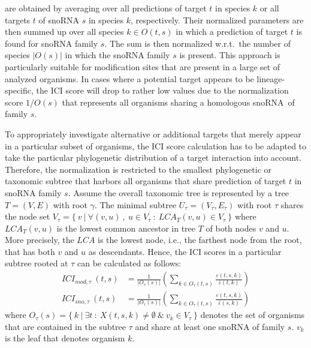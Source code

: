 \documentclass[preprint,3p,times]{elsarticle}
\newcommand{\sno}{snoRNA}
\begin{document}
are obtained by averaging over all predictions of target $t$ in
species $k$ or all targets $t$ of snoRNA $s$ in species $k$,
respectively.  Their normalized parameters are then summed up over all
species $k\in O(t,s)$ in which a prediction of target $t$ is found for
snoRNA family $s$. The sum is then normalized w.r.t.\ the number of
species $|O(s)|$ in which the snoRNA family $s$ is present. This
approach is particularly suitable for modification sites that are
present in a large set of analyzed organisms. In cases where a
potential target appears to be lineage-specific, the ICI score will
drop to rather low values due to the normalization score $1/O(s)$ that
represents all organisms sharing a homologous \sno\ of family $s$.

To appropriately investigate alternative or additional targets that
merely appear in a particular subset of organisms, the ICI score
calculation has to be adapted to take the particular phylogenetic
distribution of a target interaction into account. Therefore, the
normalization is restricted to the smallest phylogenetic or taxonomic
subtree that harbors all organisms that share prediction of target
$t$ in snoRNA family $s$.  Assume the overall taxonomic tree is
represented by a tree $T=(V,E)$ with root $\gamma$. The minimal
subtree $U_\tau = (V_\tau, E_\tau)$ with root $\tau$ shares the node
set
$V_\tau = \{\ v\ |\ \forall (v,u)\ ,\ u \in V_\tau\ :\ LCA_T(v,u) \in
V_\tau\ \}$ where $LCA_T(v,u)$ is the lowest common ancestor in tree
$T$ of both nodes $v$ and $u$. More precisely, the $LCA$ is the lowest
node, i.e., the farthest node from the root, that has both $v$ and $u$
as descendants.  Hence, the ICI scores in a particular subtree rooted
at $\tau$ can be calculated as follows:
\begin{equation}
  \begin{split}
    ICI_{mod,\tau}\:(t,s) & = \frac{1}{|O_\tau(s)|}  \left( \sum_{k\in O_\tau(t,s)} \frac{\varepsilon(t,s,k)}{\bar\varepsilon(t,k)} \right)
    \\
    ICI_{sno,\tau}\:(t,s) & = \frac{1}{|O_\tau(s)|}  \left( \sum_{k\in O_\tau(t,s)} \frac{\varepsilon(t,s,k)}{\hat\varepsilon(s,k)} \right)
  \end{split}
\end{equation}
where
$O_\tau(s) = \{\ k\ |\ \exists t\ :\ X(t,s,k) \ne \emptyset\ \&\ v_k
\in V_\tau\ \}$ denotes the set of organisms that are contained in the
subtree $\tau$ and share at least one snoRNA of family $s$. $v_k$ is
the leaf that denotes organism $k$.
\end{document}
